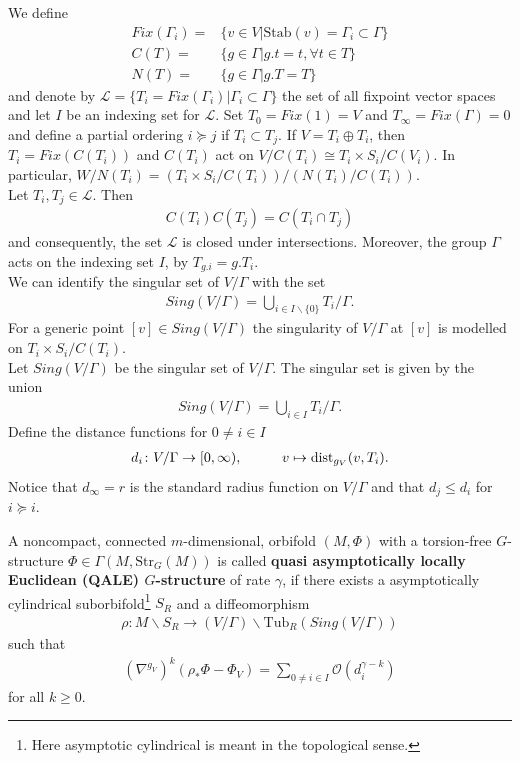 \documentclass[psamsfonts]{amsart}
\theoremstyle{plain}
\theoremstyle{definition}{
\newtheorem{defi}{Definition}[section]
\newtheorem{ass}{Assumption}
\newtheorem*{nota}{Notation}}
\theoremstyle{remark}{
\newtheorem{rem}{Remark}
\newtheorem{ex}{Example}}
\theoremstyle{plain}{
\newtheorem{thm}{Theorem}[section]
\newtheorem{lem}{Lemma}[section]
\newtheorem{cor}{Corollary}[section]
\newtheorem{prop}{Proposition}[section]
\newtheorem{con}{Conjecture}[section]}
\newcommand{\m}[1]{{\mathrm{#1}}}
\begin{document}
We define 
\begin{align*}
    Fix(\Gamma_i)=&\{v\in V|\m{Stab}(v)=\Gamma_i\subset\Gamma\}\\
    C(T)=&\{g\in\Gamma|g.t=t,\forall t\in T\}\\
    N(T)=&\{g\in\Gamma|g.T=T\}
\end{align*}
 and denote by $\mathcal{L}=\{T_i=Fix(\Gamma_i)|\Gamma_i\subset\Gamma\}$ the set of all fixpoint vector spaces and let $I$ be an indexing set for $\mathcal{L}$. Set $T_0=Fix(1)=V$ and $T_\infty=Fix(\Gamma)=0$ and define a partial ordering $i\succeq j$ if $T_i\subset T_j$. If $V=T_i\oplus T_i$, then $T_i=Fix(C(T_i))$ and $C(T_i)$ act on $V/C(T_i)\cong T_i\times S_i/C(V_i)$. In particular, $W/N(T_i)=(T_i\times S_i/C(T_i))/(N(T_i)/C(T_i))$.\\

Let $T_i,T_j\in\mathcal{L}$. Then 
\begin{align*}
    C(T_i)C(T_j)=C(T_i\cap T_j)
\end{align*}
and consequently, the set $\mathcal{L}$ is closed under intersections. Moreover, the group $\Gamma$ acts on the indexing set $I$, by $T_{g.i}=g.T_i$.\\

We can identify the singular set of $V/\Gamma$ with the set 
\begin{align*}
    Sing(V/\Gamma)=\bigcup_{i\in I\backslash\{0\}}T_i/\Gamma.
\end{align*}
For a generic point $[v]\in Sing(V/\Gamma)$ the singularity of $V/\Gamma$ at $[v]$ is modelled on $T_i\times S_i/C(T_i)$.\\

Let $Sing(V/\Gamma)$ be the singular set of $V/\Gamma$. The singular set is given by the union 
\begin{align*}
    Sing(V/\Gamma)=\bigcup_{i\in I}T_i/\Gamma.
\end{align*}
Define the distance functions for $0\neq i\in I$
\begin{align*}
    d_i\colon V/\Gamma\rightarrow[0,\infty),\hspace{1.0cm}v\mapsto \m{dist}_{g_V}(v,T_i).
\end{align*}
Notice that $d_\infty=r$ is the standard radius function on $V/\Gamma$ and that $d_j\leq d_i$ for $i\succeq i$.


\begin{defi}
A noncompact, connected $m$-dimensional, orbifold $(M,\Phi)$ with a torsion-free $G$-structure $\Phi\in\Gamma(M,\m{Str}_G(M))$ is called \textbf{quasi asymptotically locally Euclidean (QALE) $G$-structure} of rate $\gamma$, if there exists a asymptotically cylindrical suborbifold\footnote{Here asymptotic cylindrical is meant in the topological sense.} $S_R$ and a diffeomorphism 
\begin{align*}
    \rho\colon M\backslash S_R\rightarrow (V/\Gamma)\backslash \m{Tub}_R(Sing(V/\Gamma))
\end{align*}
such that 
\begin{align*}
  (\nabla^{g_{V}})^k(\rho_*\Phi-\Phi_{V})=\sum_{0\neq i\in I}\mathcal{O}(d_i^{\gamma-k})
\end{align*}
for all $k\geq0$.
\end{defi}
\end{document}
